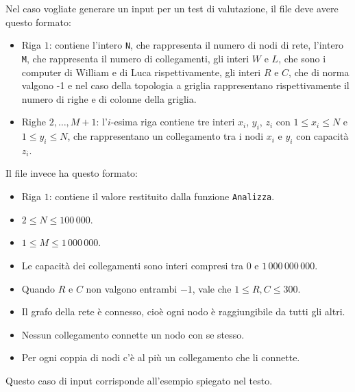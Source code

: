Nel caso vogliate generare un input per un test di valutazione, il file  deve avere questo formato:

\begin{itemize}[nolistsep,itemsep=2mm]
\item Riga $1$: contiene l'intero \texttt{N}, che rappresenta il numero di nodi di rete, l'intero \texttt{M}, che rappresenta il numero di collegamenti, gli interi $W$ e $L$, che sono i computer di William e di Luca rispettivamente, gli interi $R$ e $C$, che di norma valgono -1 e nel caso della topologia a griglia rappresentano rispettivamente il numero di righe e di colonne della griglia.
\item Righe $2, \dots, M+1$: l'$i$-esima riga contiene tre interi $x_i$, $y_i$, $z_i$ con $1\le x_i\le N$ e $1\le y_i\le N$, che rappresentano un collegamento tra i nodi $x_i$ e $y_i$ con capacità $z_i$.
\end{itemize}

Il file \outputfile{} invece ha questo formato:
\begin{itemize}[nolistsep,itemsep=2mm]
\item Riga $1$: contiene il valore restituito dalla funzione \texttt{Analizza}.
\end{itemize}

\newpage
\Constraints 
\begin{itemize}[nolistsep, itemsep=2mm]
	\item $2 \le N \le 100\,000$.
	\item $1 \le M \le 1\,000\,000$.
	\item Le capacità dei collegamenti sono interi compresi tra $0$ e $1\,000\,000\,000$.
	\item Quando $R$ e $C$ non valgono entrambi $-1$, vale che $1 \le R,C \le 300$.
	\item Il grafo della rete è connesso, cioè ogni nodo è raggiungibile da tutti gli altri.
	\item Nessun collegamento connette un nodo con se stesso.
	\item Per ogni coppia di nodi c'è al più un collegamento che li connette.
\end{itemize}

\Examples
\begin{example}
%
\end{example}

Questo caso di input corrisponde all'esempio spiegato nel testo.

